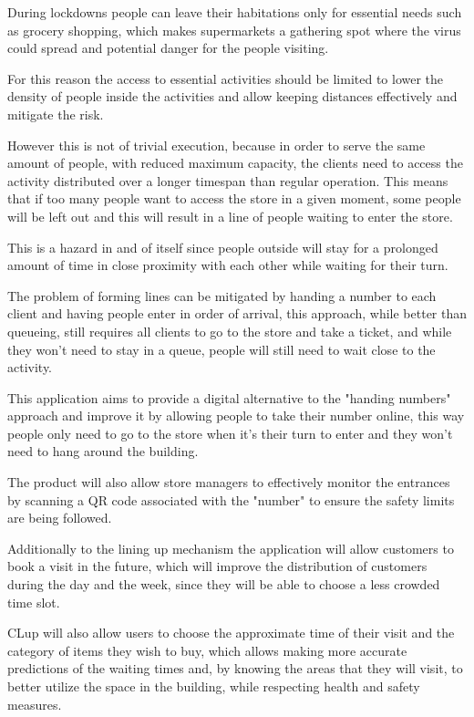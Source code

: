 During lockdowns people can leave their habitations only for essential needs such as grocery shopping, which makes supermarkets a gathering spot where the virus could spread and potential danger for the people visiting.

For this reason the access to essential activities should be limited to lower the density of people inside the activities and allow keeping distances effectively and mitigate the risk.

However this is not of trivial execution, because in order to serve the same amount of people, with reduced maximum capacity, the clients need to access the activity distributed over a longer timespan than regular operation. This means that if too many people want to access the store in a given moment, some people will be left out and this will result in a line of people waiting to enter the store.

This is a hazard in and of itself since people outside will stay for a prolonged amount of time in close proximity with each other while waiting for their turn.

The problem of forming lines can be mitigated by handing a number to each client and having people enter in order of arrival, this approach, while better than queueing, still requires all clients to go to the store and take a ticket, and while they won't need to stay in a queue, people will still need to wait close to the activity.

This application aims to provide a digital alternative to the "handing numbers" approach and improve it by allowing people to take their number online, this way people only need to go to the store when it's their turn to enter and they won't need to hang around the building.

The product will also allow store managers to effectively monitor the entrances by scanning a QR code associated with the "number" to ensure the safety limits are being followed.

Additionally to the lining up mechanism the application will allow customers to book a visit in the future, which will improve the distribution of customers during the day and the week, since they will be able to choose a less crowded time slot.

CLup will also allow users to choose the approximate time of their visit and the category of items they wish to buy, which allows making more accurate predictions of the waiting times and, by knowing the areas that they will visit, to better utilize the space in the building, while respecting health and safety measures.

